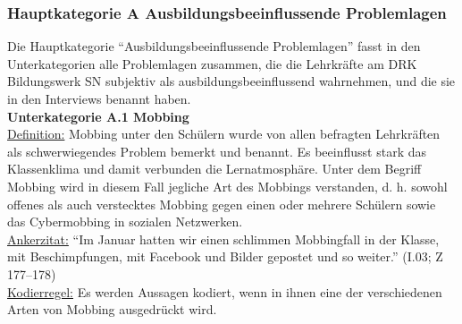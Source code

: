 \subsubsection{Hauptkategorie A Ausbildungsbeeinflussende Problemlagen}
\label{sec:HauptkategorieAAusbildungsbeeinflussendeProblemlagen}

Die Hauptkategorie "`Ausbildungsbeeinflussende Problemlagen"' fasst in den Unterkategorien alle Problemlagen zusammen, die die Lehrkräfte am DRK Bildungswerk SN subjektiv als ausbildungsbeeinflussend wahrnehmen, und die sie in den Interviews benannt haben.\\

\noindent
\textbf{Unterkategorie A.1 Mobbing}\\
\underline{Definition:} Mobbing unter den Schülern wurde von allen befragten Lehrkräften als schwerwiegendes Problem bemerkt und benannt. Es beeinflusst stark das Klassenklima und damit verbunden die Lernatmosphäre. Unter dem Begriff Mobbing wird in diesem Fall jegliche Art des Mobbings verstanden, d. h. sowohl offenes als auch verstecktes Mobbing gegen einen oder mehrere Schülern sowie das Cybermobbing in sozialen Netzwerken.\\
\underline{Ankerzitat:} "`Im Januar hatten wir einen schlimmen Mobbingfall in der Klasse, mit Beschimpfungen, mit Facebook und Bilder gepostet und so weiter."' (I.03; Z 177--178)\\
\underline{Kodierregel:} Es werden Aussagen kodiert, wenn in ihnen eine der verschiedenen Arten von Mobbing ausgedrückt wird.\\


